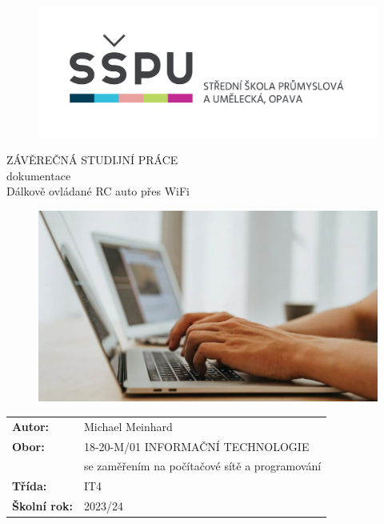 \documentclass[12pt, a4paper,
oneside,      %
openany
]{report}
\title{\nazevPrace} %
\author{\jmenoAutora} %
\date{\datumOdevzdani} %
\newcommand\obor{INFORMAČNÍ TECHNOLOGIE} %
\newcommand\kodOboru{18-20-M/01} %
\newcommand\zamereni{se zaměřením na počítačové sítě a programování} %
\newcommand\trida{IT4} %
\newcommand\jmenoAutora{Michael Meinhard}  %
\newcommand\skolniRok{2023/24} %
\newcommand\nazevPrace{Dálkově ovládané RC auto přes WiFi} %
\begin{document}
    \pagestyle{empty}
	\clearpage

	
	{\selectfont
		\begin{figure}[h]
			\centering
			\includegraphics[width=0.6\linewidth]{image/logo-skoly.png} 
		\end{figure}
		
		
		{\bfseries %
			\begin{center}
				\vspace{0.025 \textheight}
				\LARGE{ZÁVĚREČNÁ STUDIJNÍ PRÁCE}\\
				\large{dokumentace}\\
				\vspace{0.075 \textheight}
				\LARGE {\nazevPrace}\\
			\end{center}  
		}%
		
		\begin{figure}[h]
			\centering
			\includegraphics[width=0.8\linewidth]{image/programovani-02.jpg} 
		\end{figure}
		
		\vspace{0.02 \textheight}
		\begin{table}[h!]
			\begin{tabular}{ll}
				\textbf{Autor:} & \jmenoAutora\\ 
				\textbf{Obor:} & \kodOboru { } \obor\\
				\textbf{} & \zamereni\\
				\textbf{Třída:} & \trida\\
				\textbf{Školní rok:} & \skolniRok\\
			\end{tabular}
			
		\end{table}		
	}	
\clearpage
	
\end{document}
